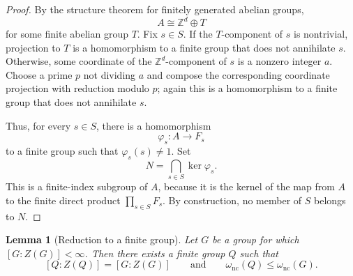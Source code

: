 \documentclass[11pt]{article}
\newtheorem{lemma}[theorem]{Lemma}
\theoremstyle{definition}
\newcommand{\Z}{\mathbb{Z}}
\newcommand{\nc}{\omega_{\mathrm{nc}}}
\begin{document}
\begin{proof}
By the structure theorem for finitely generated abelian groups,
\[
 A\cong\Z^d\oplus T
\]
for some finite abelian group $T$.  Fix $s\in S$.  If the $T$-component of
$s$ is nontrivial, projection to $T$ is a homomorphism to a finite group that
does not annihilate $s$.  Otherwise, some coordinate of the $\Z^d$-component
of $s$ is a nonzero integer $a$.  Choose a prime $p$ not dividing $a$ and
compose the corresponding coordinate projection with reduction modulo $p$;
again this is a homomorphism to a finite group that does not annihilate $s$.

Thus, for every $s\in S$, there is a homomorphism
\[
 \varphi_s:A\longrightarrow F_s
\]
to a finite group such that $\varphi_s(s)\ne1$.  Set
\[
 N=\bigcap_{s\in S}\ker\varphi_s.
\]
This is a finite-index subgroup of $A$, because it is the kernel of the map
from $A$ to the finite direct product $\prod_{s\in S}F_s$.  By construction,
no member of $S$ belongs to $N$.
\end{proof}

\begin{lemma}[Reduction to a finite group]\label{lem:finite-reduction}
Let $G$ be a group for which $[G:Z(G)]<\infty$.  Then there exists a finite
group $Q$ such that
\[
 [Q:Z(Q)]=[G:Z(G)]
 \qquad\text{and}\qquad
 \nc(Q)\le\nc(G).
\]
\end{lemma}
\end{document}

